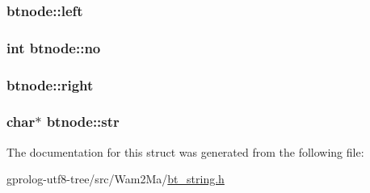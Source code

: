 \subsubsection[{\texorpdfstring{left}{left}}]{ btnode\+::left}\hypertarget{structbtnode_a595372884aee31dd6b91ba5400f98794}{}\label{structbtnode_a595372884aee31dd6b91ba5400f98794}
\subsubsection[{\texorpdfstring{no}{no}}]{\setlength{\rightskip}{0pt plus 5cm}int btnode\+::no}\hypertarget{structbtnode_ae1befed4e49931603b1a62f760242f52}{}\label{structbtnode_ae1befed4e49931603b1a62f760242f52}
\subsubsection[{\texorpdfstring{right}{right}}]{ btnode\+::right}\hypertarget{structbtnode_a5a315554fa5e275f6f505e94135b1cf4}{}\label{structbtnode_a5a315554fa5e275f6f505e94135b1cf4}
\subsubsection[{\texorpdfstring{str}{str}}]{\setlength{\rightskip}{0pt plus 5cm}char$\ast$ btnode\+::str}\hypertarget{structbtnode_ad3235a44ef495ead7832dc7242184d3b}{}\label{structbtnode_ad3235a44ef495ead7832dc7242184d3b}


The documentation for this struct was generated from the following file\+:\begin{DoxyCompactItemize}
\item 
gprolog-\/utf8-\/tree/src/\+Wam2\+Ma/\hyperlink{bt__string_8h}{bt\+\_\+string.\+h}\end{DoxyCompactItemize}
